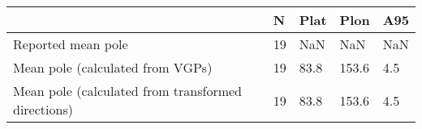 \begin{tabular}{lllll}
\toprule
{} &   N &  Plat &   Plon &  A95 \\
\midrule
Reported mean pole                                 &  19 &   NaN &    NaN &  NaN \\
Mean pole (calculated from VGPs)                   &  19 &  83.8 &  153.6 &  4.5 \\
Mean pole (calculated from transformed directions) &  19 &  83.8 &  153.6 &  4.5 \\
\bottomrule
\end{tabular}
